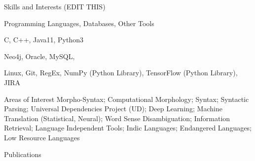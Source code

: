 \documentclass{resume} %
\begin{document}
\begin{rSection}{Skills and Interests (EDIT THIS)}

\begin{rSubsection}{Programming Languages, Databases, Other Tools}{}{}{}
\item C, C++, Java11, Python3
\item Neo4j, Oracle, MySQL, 
\item Linux, Git, RegEx, NumPy (Python Library), TensorFlow (Python Library), JIRA
\end{rSubsection}

\begin{rSubsection}{Areas of Interest}{}{}{}
    Morpho-Syntax; Computational Morphology; Syntax; Syntactic Parsing; 
    Universal Dependencies Project (UD); Deep Learning; Machine Translation 
    (Statistical, Neural); Word Sense Disambiguation; Information Retrieval; 
    Language Independent Tools; Indic Languages; Endangered Languages; Low 
    Resource Languages
\end{rSubsection}

\end{rSection}


\begin{rSection}{Publications}


    {}

    {}
    
    {}

    {}

\end{rSection}


\end{document}
